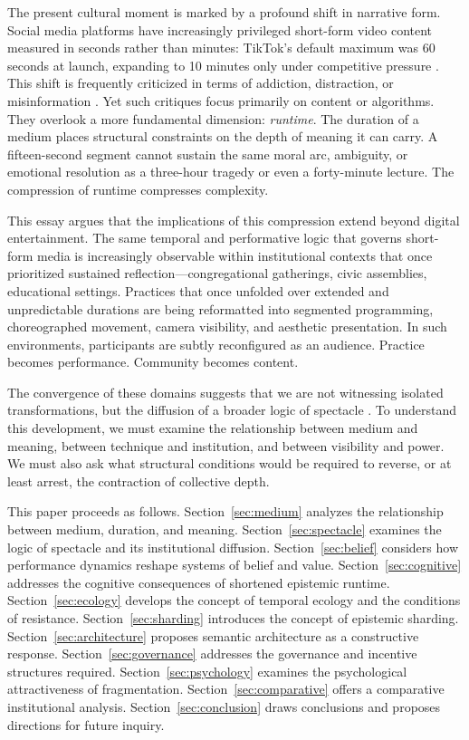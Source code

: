 \documentclass[11pt]{article}
\begin{document}
The present cultural moment is marked by a profound shift in narrative form. Social media platforms have increasingly privileged short-form video content measured in seconds rather than minutes: TikTok's default maximum was 60 seconds at launch, expanding to 10 minutes only under competitive pressure \citep{Herrman2019}. This shift is frequently criticized in terms of addiction, distraction, or misinformation \citep{Twenge2017,Haidt2023}. Yet such critiques focus primarily on content or algorithms. They overlook a more fundamental dimension: \emph{runtime}. The duration of a medium places structural constraints on the depth of meaning it can carry. A fifteen-second segment cannot sustain the same moral arc, ambiguity, or emotional resolution as a three-hour tragedy or even a forty-minute lecture. The compression of runtime compresses complexity.

This essay argues that the implications of this compression extend beyond digital entertainment. The same temporal and performative logic that governs short-form media is increasingly observable within institutional contexts that once prioritized sustained reflection---congregational gatherings, civic assemblies, educational settings. Practices that once unfolded over extended and unpredictable durations are being reformatted into segmented programming, choreographed movement, camera visibility, and aesthetic presentation. In such environments, participants are subtly reconfigured as an audience. Practice becomes performance. Community becomes content.

The convergence of these domains suggests that we are not witnessing isolated transformations, but the diffusion of a broader logic of spectacle \citep{Debord1994}. To understand this development, we must examine the relationship between medium and meaning, between technique and institution, and between visibility and power. We must also ask what structural conditions would be required to reverse, or at least arrest, the contraction of collective depth.

This paper proceeds as follows. Section~\ref{sec:medium} analyzes the relationship between medium, duration, and meaning. Section~\ref{sec:spectacle} examines the logic of spectacle and its institutional diffusion. Section~\ref{sec:belief} considers how performance dynamics reshape systems of belief and value. Section~\ref{sec:cognitive} addresses the cognitive consequences of shortened epistemic runtime. Section~\ref{sec:ecology} develops the concept of temporal ecology and the conditions of resistance. Section~\ref{sec:sharding} introduces the concept of epistemic sharding. Section~\ref{sec:architecture} proposes semantic architecture as a constructive response. Section~\ref{sec:governance} addresses the governance and incentive structures required. Section~\ref{sec:psychology} examines the psychological attractiveness of fragmentation. Section~\ref{sec:comparative} offers a comparative institutional analysis. Section~\ref{sec:conclusion} draws conclusions and proposes directions for future inquiry.
\end{document}
